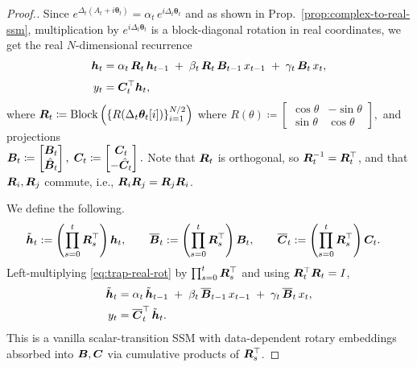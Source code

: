\begin{proof}[Proof.]
\medskip
Since $e^{\Delta_t(A_t+i\boldsymbol{\theta}_t)}=\alpha_t\,e^{i\Delta_t\boldsymbol{\theta}_t}$ and as shown in Prop.~\ref{prop:complex-to-real-ssm}, multiplication by $e^{i\Delta_t\boldsymbol{\theta}_t}$ is a block-diagonal rotation in real coordinates, we get the real $N$-dimensional recurrence
\begin{align}
\label{eq:trap-real-rot}
{\bm{h}}_t
&= \alpha_t\,{\bm{R}}_t\,{\bm{h}}_{t-1}
  \;+\; \beta_t\,{\bm{R}}_t\,{\bm{B}}_{t-1}\,x_{t-1}
  \;+\; \gamma_t\,{\bm{B}}_t\,x_t,\\[0.25em]
y_t
&= {\bm{C}}_t^\top {\bm{h}}_t,\nonumber
\end{align}
where ${\bm{R}}_t\coloneqq\mathrm{Block}\left(\{R(\Delta_t\boldsymbol{\theta}_t[i])\}_{i=1}^{N/2}\right)$ where
\(
R(\theta)\coloneqq\begin{bmatrix}\cos\theta&-\sin\theta\\ \sin\theta&\cos\theta\end{bmatrix},
\)
and projections \\
\(
{\bm{B}}_t\coloneqq\begin{bmatrix}{\bm{B}}_t\\ \hat{{\bm{B}}}_t\end{bmatrix},\;
{\bm{C}}_t\coloneqq\begin{bmatrix}{\bm{C}}_t\\ -\hat{{\bm{C}}}_t\end{bmatrix}.
\)
Note that ${\bm{R}}_t$ is orthogonal, so ${\bm{R}}_t^{-1}={\bm{R}}_t^\top$, and that ${\bm{R}}_i, {\bm{R}}_j$ commute, i.e., ${\bm{R}}_i{\bm{R}}_j={\bm{R}}_j{\bm{R}}_i$.

\medskip
We define the following.
\begin{align*}
\tilde{{\bm{h}}}_t
&:= \left(\prod_{s=0}^{t}{\bm{R}}_s^\top\right){\bm{h}}_t,\qquad
\overline{{\bm{B}}}_{t} := \left(\prod_{s=0}^{t}{\bm{R}}_s^\top\right){\bm{B}}_{t},\qquad
\overline{{\bm{C}}}_{t} := \left(\prod_{s=0}^{t}{\bm{R}}_s^\top\right){\bm{C}}_{t}.
\end{align*}
Left-multiplying \eqref{eq:trap-real-rot} by $\prod_{s=0}^{t}{\bm{R}}_s^\top$ and using ${\bm{R}}_t^\top{\bm{R}}_t=I$,
\begin{align*}
\tilde{{\bm{h}}}_t
&= \alpha_t\,\tilde{{\bm{h}}}_{t-1}
  \;+\; \beta_t\,\overline{{\bm{B}}}_{t-1}\,x_{t-1}
  \;+\; \gamma_t\,\overline{{\bm{B}}}_{t}\,x_t,\\
y_t
&= \overline{{\bm{C}}}_t^\top\,\tilde{{\bm{h}}}_t.
\end{align*}
This is a vanilla scalar-transition SSM with data-dependent rotary embeddings absorbed into ${\bm{B}},{\bm{C}}$ via cumulative products of ${\bm{R}}_s^\top$.
\end{proof}
